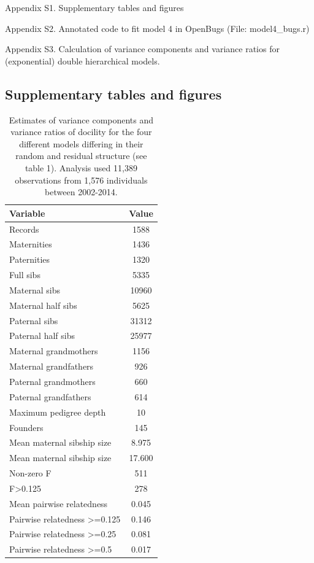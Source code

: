 \documentclass[a4paper,12pt,twoside]{article}
\begin{document}
	
	\noindent Appendix S1. Supplementary tables and figures
	
	\noindent Appendix S2. Annotated code to fit model 4 in OpenBugs (File: model4\_bugs.r)
	
	\noindent Appendix S3. Calculation of variance components and variance ratios for (exponential) double hierarchical models.
	
	\subsection{Supplementary tables and figures}\label{ESM:tabfig}
	
	\begin{table}[h!]
		\caption{Estimates of variance components and variance ratios of docility for the four different models differing in their random and residual structure (see table 1). 
			Analysis used 11,389 observations from 1,576 individuals between 2002-2014.}
		\label{Tab:pedigree}
		\centering
		\small
		\begin{tabular}{l c}
			\hline
			Variable & Value\\
			\hline
			Records & 1588\\
			Maternities & 1436\\
			Paternities & 1320\\
			Full sibs & 5335\\
			Maternal sibs & 10960\\
			Maternal half sibs & 5625\\
			Paternal sibs & 31312\\
			Paternal half sibs & 25977\\
			Maternal grandmothers & 1156\\
			Maternal grandfathers & 926\\
			Paternal grandmothers & 660\\
			Paternal grandfathers & 614\\
			Maximum pedigree depth & 10\\
			Founders & 145\\
			Mean maternal sibship size & 8.975\\
			Mean maternal sibship size & 17.600\\
			Non-zero F & 511\\
			F>0.125 & 278\\
			Mean pairwise relatedness & 0.045\\
			Pairwise relatedness >=0.125 & 0.146\\
			Pairwise relatedness >=0.25 & 0.081\\
			Pairwise relatedness >=0.5 & 0.017\\
			\hline
		\end{tabular}
	\end{table}
	
\end{document}

